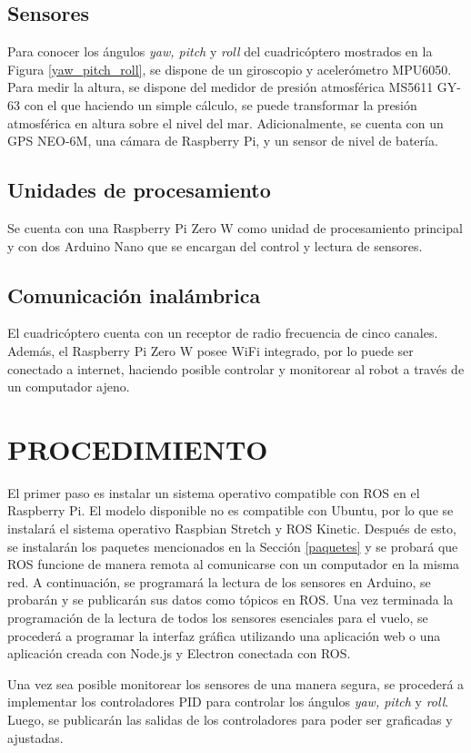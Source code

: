 \documentclass[letterpaper, 10 pt, conference]{ieeeconf}  %
\begin{document}
\subsection{Sensores}
Para conocer los ángulos \textit{yaw, pitch} y \textit{roll} del cuadricóptero mostrados en la Figura \ref{yaw_pitch_roll}, se dispone de un giroscopio y acelerómetro MPU6050. Para medir la altura, se dispone del medidor de presión atmosférica MS5611 GY-63 con el que haciendo un simple cálculo, se puede transformar la presión atmosférica en altura sobre el nivel del mar. Adicionalmente, se cuenta con un GPS NEO-6M, una cámara de Raspberry Pi, y un sensor de nivel de batería.

\subsection{Unidades de procesamiento}
Se cuenta con una Raspberry Pi Zero W como unidad de procesamiento principal y con dos Arduino Nano que se encargan del control y lectura de sensores.

\subsection{Comunicación inalámbrica}
El cuadricóptero cuenta con un receptor de radio frecuencia de cinco canales. Además, el Raspberry Pi Zero W posee WiFi integrado, por lo puede ser conectado a internet, haciendo posible controlar y monitorear al robot a través de un computador ajeno.


\section{PROCEDIMIENTO}
El primer paso es instalar un sistema operativo compatible con ROS en el Raspberry Pi. El modelo disponible no es compatible con Ubuntu, por lo que se instalará el sistema operativo Raspbian Stretch \cite{raspbian} y ROS Kinetic. Después de esto, se instalarán los paquetes mencionados en la Sección \ref{paquetes} y se probará que ROS funcione de manera remota al comunicarse con un computador en la misma red. A continuación, se programará la lectura de los sensores en Arduino, se probarán y se publicarán sus datos como tópicos en ROS. Una vez terminada la programación de la lectura de todos los sensores esenciales para el vuelo, se procederá a programar la interfaz gráfica utilizando una aplicación web o una aplicación creada con Node.js y Electron conectada con ROS.

Una vez sea posible monitorear los sensores de una manera segura, se procederá a implementar los controladores PID para controlar los ángulos \textit{yaw, pitch} y \textit{roll}. Luego, se publicarán las salidas de los controladores para poder ser graficadas y ajustadas.
\end{document}
